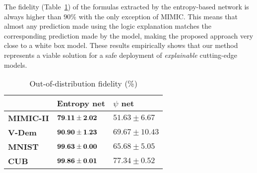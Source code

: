 \documentclass[withindex,glossary]{cam-thesis}
\theoremstyle{plain}
\theoremstyle{definition}
\theoremstyle{remark}
\begin{document}
The fidelity (Table~\ref{tab:fidelity})
of the formulas extracted by the entropy-based network is always higher than $90\%$ with the only exception of MIMIC. This means that almost any prediction made using the logic explanation matches the corresponding prediction made by the model, making the proposed approach very close to a white box model.
These results empirically shows that our method represents a viable solution for a safe %
deployment of \textit{explainable} cutting-edge models.



\begin{table}[t]
\small
\centering
\begin{tabular}{lll}
\toprule
{} &         Entropy net  &        $\psi$ net \\
\midrule
\textbf{MIMIC-II     } &  ${\bf 79.11  \pm 2.02}$ &   $51.63 \pm 6.67$ \\
\textbf{V-Dem         }&  ${\bf 90.90 \pm 1.23}$ &  $69.67 \pm 10.43$ \\
\textbf{MNIST}         &  ${\bf 99.63 \pm 0.00}$ & $65.68 \pm 5.05$ \\
\textbf{CUB         }  &  ${\bf 99.86 \pm 0.01}$ &  $77.34 \pm 0.52$ \\
\bottomrule
\end{tabular}
\caption{Out-of-distribution fidelity (\%)}
\label{tab:fidelity}
\end{table}
\end{document}
